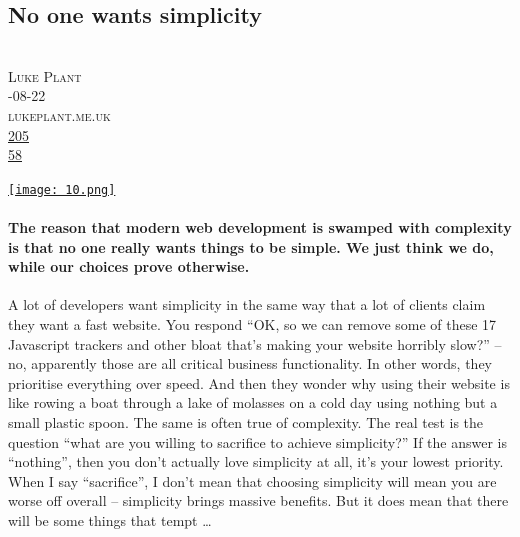 \documentclass[10pt,a4paper]{article}
\begin{document}
\subsection{No one wants simplicity}
\noindent\begin{minipage}[t]{0.19\linewidth}
\vspace{0pt}
\noindent\scshape\footnotesize
\\ {\scriptsize\faUser}\space 
Luke Plant
\\ {\scriptsize\faCalendar}-08-22
\\ {\scriptsize\faGlobe}\space 
lukeplant.me.uk
\\ {\scriptsize\faThumbsOUp}\space 
\href{http://news.ycombinator.com/item?id=37229435\&utm\_term=comment}{205} 
\\ {\scriptsize\faComments}\space 
\href{http://news.ycombinator.com/item?id=37229435\&utm\_term=comment}{58} 
\end{minipage} 
\begin{minipage}[t]{0.80\linewidth}
\vspace{0pt}
\begin{multicols}{2}
    \href{https://lukeplant.me.uk/blog/posts/no-one-actually-wants-simplicity/?utm\_source=hackernewsletter\&utm\_medium=email\&utm\_term=fav}{
        \texttt{[image: 10.png]}
    }
\paragraph{The reason that modern web development is swamped with complexity is that no one really wants things to be simple. We just think we do, while our choices prove otherwise.}

A lot of developers want simplicity in the same way that a lot of clients claim they want a fast website. You respond “OK, so we can remove some of these 17 Javascript trackers and other bloat that’s making your website horribly slow?” – no, apparently those are all critical business functionality.
In other words, they prioritise everything over speed. And then they wonder why using their website is like rowing a boat through a lake of molasses on a cold day using nothing but a small plastic spoon.
The same is often true of complexity. The real test is the question “what are you willing to sacrifice to achieve simplicity?” If the answer is “nothing”, then you don’t actually love simplicity at all, it’s your lowest priority.
When I say “sacrifice”, I don’t mean that choosing simplicity will mean you are worse off overall – simplicity brings massive benefits. But it does mean that there will be some things that tempt 
\dots
\end{multicols}
\end{minipage}
\par\medskip
\end{document}
